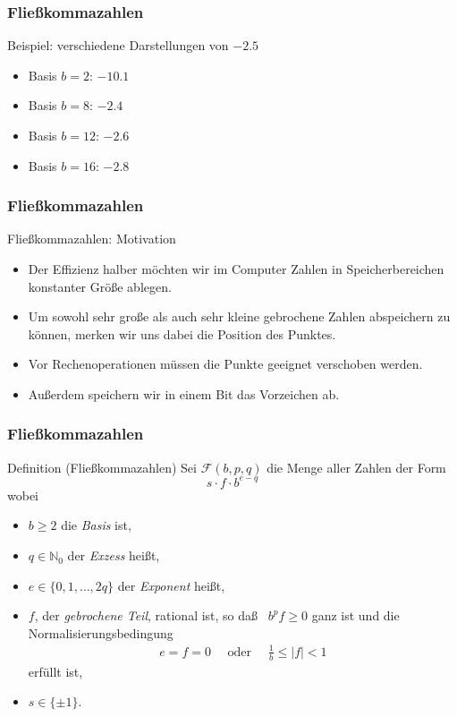 \documentclass{beamer}
\renewcommand{\emph}[1]{{\textcolor{solarizedRed}{\itshape #1}}}
\newcommand\cF{\mathcal F}
\newcommand\NN{\mathbb N}
\renewcommand{\oe}{\"o}
\newcommand{\ue}{\"u}
\newcommand{\mytitle}{Flie\ss kommazahlen}
\begin{document}
\begin{frame}\frametitle{\mytitle}
	\begin{block}{Beispiel: verschiedene Darstellungen von $-2.5$}
		\begin{itemize}
			\item \alert{Basis $b=2$:} $-10.1$
			\item \alert{Basis $b=8$:} $-2.4$
			\item \alert{Basis $b=12$:} $-2.6$
			\item \alert{Basis $b=16$:} $-2.8$
		\end{itemize}
	\end{block}
\end{frame}

\begin{frame}\frametitle{\mytitle}
	\begin{block}{Flie\ss kommazahlen: Motivation}
\begin{itemize}
\item Der Effizienz halber m\"ochten wir im Computer Zahlen in Speicherbereichen konstanter Gr\oe\ss e ablegen.
	\item Um sowohl sehr gro\ss e als auch sehr kleine gebrochene Zahlen abspeichern zu k\oe nnen, merken wir uns dabei die Position des Punktes.
	\item Vor Rechenoperationen m\ue ssen die Punkte geeignet verschoben werden.
	\item Au\ss erdem speichern wir in einem Bit das Vorzeichen ab.
\end{itemize}
	\end{block}
\end{frame}

\begin{frame}\frametitle{\mytitle}
	\begin{block}{Definition (Flie\ss kommazahlen)}
Sei $\cF(b,p,q)$ die Menge aller Zahlen der Form
	$$s\cdot f\cdot b^{e-q}$$
wobei
	\begin{itemize}
	\item $b\geq2$ die \emph{Basis} ist,
	\item $q\in\NN_0$ der \emph{Exzess} hei\ss t,
	\item $e\in\{0,1,\ldots,2q\}$ der \emph{Exponent} hei\ss t,
	\item $f$, der \emph{gebrochene Teil}, rational ist, so da\ss\ %
		$b^pf\geq0$ ganz ist und die \alert{Normalisierungsbedingung}
			\begin{align*}
				e=f=0\quad\mbox{ oder }\quad\frac1b\leq|f|<1
			\end{align*}
erf\ue llt ist,
	\item $s\in\{\pm1\}$.
	\end{itemize}

	\end{block}
\end{frame}
\end{document}
